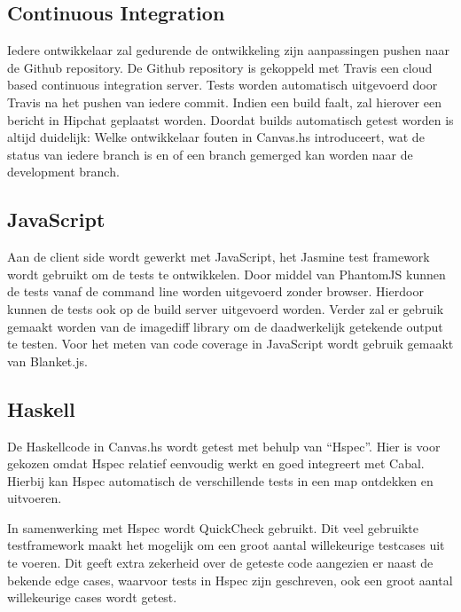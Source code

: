 \subsection{Continuous Integration}
Iedere ontwikkelaar zal gedurende de ontwikkeling zijn aanpassingen pushen naar de Github repository. De Github repository is gekoppeld met Travis een cloud based continuous integration server. Tests worden automatisch uitgevoerd door Travis na het pushen van iedere commit. Indien een build faalt, zal hierover een bericht in Hipchat geplaatst worden. Doordat builds automatisch getest worden is altijd duidelijk: Welke ontwikkelaar fouten in Canvas.hs introduceert, wat de status van iedere branch is en of een branch gemerged kan worden naar de development branch.

\subsection{JavaScript} 
Aan de client side wordt gewerkt met JavaScript, het Jasmine test framework wordt gebruikt om de tests te ontwikkelen. Door middel van PhantomJS kunnen de tests vanaf de command line worden uitgevoerd zonder browser. Hierdoor kunnen de tests ook op de build server uitgevoerd worden. Verder zal er gebruik gemaakt worden van de imagediff library om de daadwerkelijk getekende output te testen. Voor het meten van code coverage in JavaScript wordt gebruik gemaakt van Blanket.js.

\subsection{Haskell}
De Haskellcode in Canvas.hs wordt getest met behulp van ``Hspec''. Hier is voor gekozen omdat Hspec relatief eenvoudig werkt en goed integreert met Cabal. Hierbij kan Hspec automatisch de verschillende tests in een map ontdekken en uitvoeren.

In samenwerking met Hspec wordt QuickCheck gebruikt. Dit veel gebruikte testframework maakt het mogelijk om een groot aantal willekeurige testcases uit te voeren. Dit geeft extra zekerheid over de geteste code aangezien er naast de bekende edge cases, waarvoor tests in Hspec zijn geschreven, ook een groot aantal willekeurige cases wordt getest.